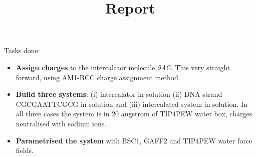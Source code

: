 \documentclass{article}
\date{\displaydate{date}}
\title{Report}
\begin{document}
\maketitle


Tasks done:

\begin{itemize}
  \item \textbf{Assign charges} to the intercalator molecule \emph{9AC}. This very straight forward, using AM1-BCC charge assignment method.
  \item \textbf{Build three systems}: (i) intercalator in solution (ii) DNA strand CGCGAATTCGCG in solution and (iii) intercalated system in solution. In all three cases the system is in 20 angstrom of TIP4PEW water box, charges neutralised with sodium ions.
  \item \textbf{Parametrised the system} with BSC1, GAFF2 and TIP4PEW water force fields.
\end{itemize}
\end{document}

